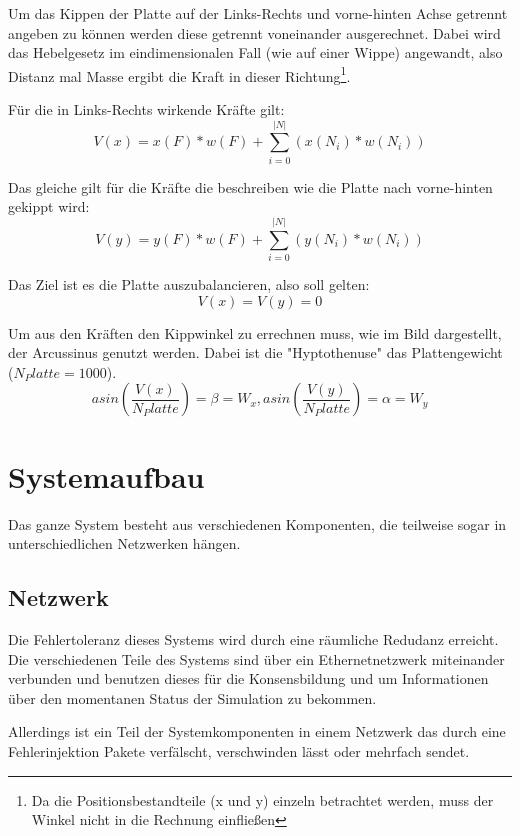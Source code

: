 \documentclass[
    12pt,
    bibliography=totoc,
    ngerman,
	enabledeprecatedfontcommands
]{scrartcl}
\begin{document}
Um das Kippen der Platte auf der Links-Rechts und vorne-hinten Achse getrennt angeben zu k{\"{o}}nnen werden diese getrennt voneinander ausgerechnet. Dabei wird das Hebelgesetz im eindimensionalen Fall (wie auf einer Wippe) angewandt, also Distanz mal Masse ergibt die Kraft in dieser Richtung\footnote{Da die Positionsbestandteile (x und y) einzeln betrachtet werden, muss der Winkel nicht in die Rechnung einflie{\ss}en}.

F{\"{u}}r die in Links-Rechts wirkende Kr{\"{a}}fte gilt:
$$ V(x) = x(F) * w(F) + \sum_{i=0}^{|N|} ( x(N_i) * w(N_i) ) $$

Das gleiche gilt f{\"{u}}r die Kr{\"{a}}fte die beschreiben wie die Platte nach vorne-hinten gekippt wird:
$$ V(y) = y(F) * w(F) + \sum_{i=0}^{|N|} ( y(N_i) * w(N_i) ) $$

Das Ziel ist es die Platte auszubalancieren, also soll gelten:
$$ V(x) = V(y) = 0 $$

Um aus den Kr{\"{a}}ften den Kippwinkel zu errechnen muss, wie im Bild dargestellt, der Arcussinus genutzt werden. Dabei ist die "Hyptothenuse" das Plattengewicht ($ N_Platte = 1000$). 
$$ asin(\frac{V(x)}{ N_Platte}) = \beta = W_{x}, asin(\frac{V(y)}{N_Platte}) = \alpha = W_{y} $$

\clearpage
\section{Systemaufbau}
Das ganze System besteht aus verschiedenen Komponenten, die teilweise sogar in unterschiedlichen Netzwerken h{\"{a}}ngen. 

\subsection{Netzwerk}\label{network}
Die Fehlertoleranz dieses Systems wird durch eine r{\"{a}}umliche Redudanz erreicht. Die verschiedenen Teile des Systems sind {\"{u}}ber ein Ethernetnetzwerk miteinander verbunden und benutzen dieses
f{\"{u}}r die Konsensbildung und um Informationen {\"{u}}ber den momentanen Status der Simulation zu bekommen.

Allerdings ist ein Teil der Systemkomponenten in einem Netzwerk das durch eine Fehlerinjektion Pakete verf{\"{a}}lscht, verschwinden l{\"{a}}sst oder mehrfach sendet. 
\end{document}
